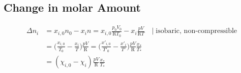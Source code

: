 \subsection{Change in molar Amount}
\label{app:molar-amount}
\begin{equation}
    \begin{aligned}
        \Delta n_i &= x_{i,0} n_0 - x_i n = x_{i,0} \frac{p_0 V_0}{\mathrm{R} T_0} - x_i \frac{p V}{\mathrm{R} T} \quad | \; \text{isobaric, non-compressible} \\
                &= \bigg ( \frac{x_{i,0}}{T_0} - \frac{x_i}{T} \bigg ) \frac{pV}{\mathrm{R}}
                = \bigg ( \frac{x'_{i,0}}{T'_0} - \frac{x'_i}{T'} \bigg ) \frac{pV}{\mathrm{R}} \frac{x_*}{T_*} \\
                &= ( \chi_{i,0} - \chi_{i} ) \frac{pV}{\mathrm{R}} \frac{x_*}{T_*}
    \end{aligned}
\end{equation}

\newpage
